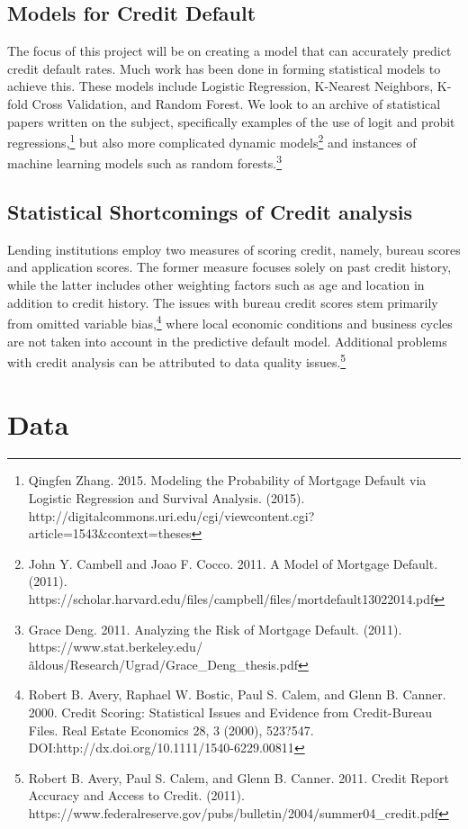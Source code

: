 \documentclass[sigconf, 11pt]{acmart}
\begin{document}
\subsection{Models for Credit Default}
The focus of this project will be on creating a model that can accurately predict credit default rates. Much work has been done in forming statistical models to achieve this. These models include Logistic Regression, K-Nearest Neighbors, K-fold Cross Validation, and Random Forest. We look to an archive of statistical papers written on the subject, specifically examples of the use of logit and probit regressions,\footnote{Qingfen Zhang. 2015. Modeling the Probability of Mortgage Default via Logistic Regression and Survival Analysis. (2015). http://digitalcommons.uri.edu/cgi/viewcontent.cgi?article=1543\&context=theses} but also more complicated dynamic models\footnote{John Y. Cambell and Joao F. Cocco. 2011. A Model of Mortgage Default. (2011). https://scholar.harvard.edu/files/campbell/files/mortdefault13022014.pdf} and instances of machine learning models such as random forests.\footnote{Grace Deng. 2011. Analyzing the Risk of Mortgage Default. (2011). https://www.stat.berkeley.edu/\~aldous/Research/Ugrad/Grace\_Deng\_thesis.pdf}

\subsection{Statistical Shortcomings of Credit analysis}
Lending institutions employ two measures of scoring credit, namely, bureau scores and application scores. The former measure focuses solely on past credit history, while the latter includes other weighting factors such as age and location in addition to credit history. The issues with bureau credit scores stem primarily from omitted variable bias,\footnote{Robert B. Avery, Raphael W. Bostic, Paul S. Calem, and Glenn B. Canner. 2000. Credit Scoring: Statistical Issues and Evidence from Credit-Bureau Files. Real Estate Economics 28, 3 (2000), 523?547. DOI:http://dx.doi.org/10.1111/1540-6229.00811} where local economic conditions and business cycles are not taken into account in the predictive default model. Additional problems with credit analysis can be attributed to data quality issues.\footnote{Robert B. Avery, Paul S. Calem, and Glenn B. Canner. 2011. Credit Report Accuracy and Access to Credit. (2011). https://www.federalreserve.gov/pubs/bulletin/2004/summer04\_credit.pdf}

\section{Data}
\end{document}
